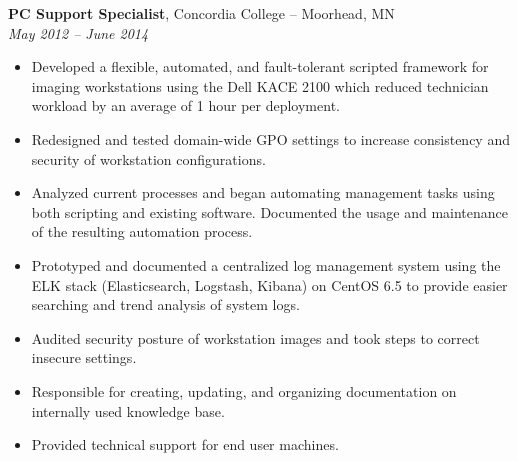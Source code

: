 {\bf PC Support Specialist}, Concordia College -- Moorhead, MN\\
{\it May 2012 – June 2014}
\begin{itemize}
	\item Developed a flexible, automated, and fault-tolerant scripted framework for imaging workstations using the Dell KACE 2100 which reduced technician workload by an average of 1 hour per deployment.
	\item Redesigned and tested domain-wide GPO settings to increase consistency and security of workstation configurations.
	\item Analyzed current processes and began automating management tasks using both scripting and existing software. Documented the usage and maintenance of the resulting automation process.
	\item Prototyped and documented a centralized log management system using the ELK stack (Elasticsearch, Logstash, Kibana) on CentOS 6.5 to provide easier searching and trend analysis of system logs.
	\item Audited security posture of workstation images and took steps to correct insecure settings.
	\item Responsible for creating, updating, and organizing documentation on internally used knowledge base.
	\item Provided technical support for end user machines.
\end{itemize}